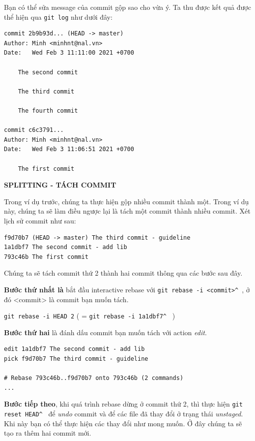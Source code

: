 \documentclass[a4paper, 11pt]{article}
\begin{document}
Bạn có thể sửa message của commit gộp sao cho vừa ý. Ta thu được kết quả được thể hiện qua \texttt{git log} như dưới đây:

\begin{verbatim}
commit 2b9b93d... (HEAD -> master)
Author: Minh <minhnt@nal.vn>
Date:   Wed Feb 3 11:11:00 2021 +0700

    The second commit

    The third commit

    The fourth commit

commit c6c3791...
Author: Minh <minhnt@nal.vn>
Date:   Wed Feb 3 11:06:51 2021 +0700

    The first commit
\end{verbatim}

\textit{}

\textbf{SPLITTING - TÁCH COMMIT}

Trong ví dụ trước, chúng ta thực hiện gộp nhiều commit thành một. Trong ví dụ này, chúng ta sẽ làm điều ngược lại là tách một commit thành nhiều commit. Xét lịch sử commit như sau:

\begin{verbatim}
f9d70b7 (HEAD -> master) The third commit - guideline
1a1dbf7 The second commit - add lib
793c46b The first commit
\end{verbatim}

Chúng ta sẽ tách commit thứ 2 thành hai commit thông qua các bước sau đây.

\textbf{Bước thứ nhất là} bắt đầu interactive rebase với \texttt{git rebase -i <commit>\string^ }, ở đó <commit> là commit bạn muốn tách.

 \texttt{git rebase -i HEAD\string~2} ( = \texttt{git rebase -i 1a1dbf7\string^ } )
 
\textbf{Bước  thứ hai} là đánh dấu commit bạn muốn tách với action \textit{edit}.

\begin{verbatim}
edit 1a1dbf7 The second commit - add lib
pick f9d70b7 The third commit - guideline

# Rebase 793c46b..f9d70b7 onto 793c46b (2 commands)
...
\end{verbatim}

\textbf{Bước tiếp theo}, khi quá trình rebase dừng ở commit thứ 2, thì thực hiện \texttt{git reset HEAD\string^ } để \textit{undo} commit và để các file đã thay đổi ở trạng thái \textit{unstaged}. Khi này bạn có thể thực hiện các thay đổi như mong muốn. Ở đây chúng ta sẽ tạo ra thêm hai commit mới.
\end{document}
